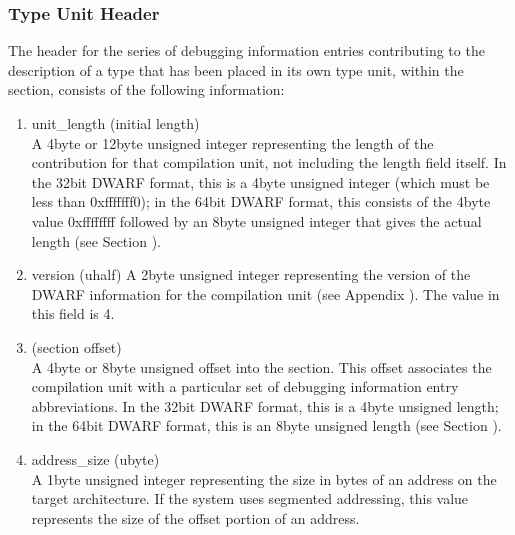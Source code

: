\subsubsection{Type Unit Header}
\label{datarep:typeunitheader}

The header for the series of debugging information entries
contributing to the description of a type that has been
placed in its own type unit, within the 
 section,
consists of the following information:

\begin{enumerate}[1.]

\item unit\_length (initial length) \\
A 4\dash byte or 12\dash byte unsigned integer representing the length
of the  contribution for that compilation unit,
not including the length field itself. In the 32\dash bit DWARF
format, this is a 4\dash byte unsigned integer (which must be
less than 0xfffffff0); in the 64\dash bit DWARF format, this
consists of the 4\dash byte value 0xffffffff followed by an 
8\dash byte unsigned integer that gives the actual length
(see Section ).

\item  version (uhalf)
A 2\dash byte unsigned integer representing the version of the
DWARF information for the compilation unit 
(see Appendix ). 
The value in this field is 4.

\item {} (section offset) \\
A 4\dash byte or 8\dash byte unsigned offset into the 
section. This offset associates the compilation unit with a
particular set of debugging information entry abbreviations. In
the 32\dash bit DWARF format, this is a 4\dash byte unsigned length;
in the 64\dash bit DWARF format, this is an 8\dash byte unsigned length
(see Section ).

\item address\_size (ubyte) \\
A 1\dash byte unsigned integer representing the size in bytes of
an address on the target architecture. If the system uses
segmented addressing, this value represents the size of the
offset portion of an address.



\end{enumerate}
